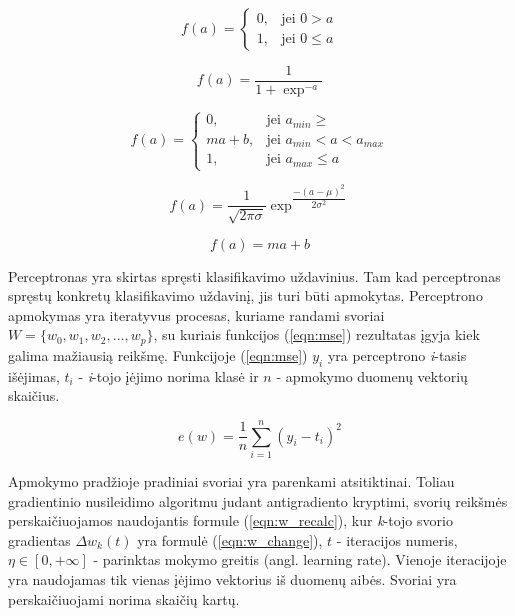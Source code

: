 \begin{equation}
	\label{eqn:unitStep}
	f(a) =
	\begin{cases}
		0, & \mbox{jei } 0 > a \\
		1, & \mbox{jei } 0 \leq a
	\end{cases}
\end{equation}

\begin{equation}
	\label{eqn:sigmoid}
	f(a) = \dfrac{1}{1 + \exp^{-a }}
\end{equation}

\begin{equation}
	\label{eqn:pieceLinear}
	f(a) =
	\begin{cases}
		0, & \mbox{jei } a_{min} \geq  \\
		ma + b, & \mbox{jei } a_{min} < a < a_{max} \\
		1, & \mbox{jei } a_{max} \leq a
	\end{cases}
\end{equation}

\begin{equation}
	\label{eqn:gaussian}
	f(a) = \dfrac{1}{\sqrt{2\pi\sigma}} \exp^{\dfrac{-(a - \mu)^2}{2\sigma^2}}
\end{equation}

\begin{equation}
	\label{eqn:linear}
	f(a) = ma + b
\end{equation}

Perceptronas yra skirtas spręsti klasifikavimo uždavinius. Tam kad perceptronas spręstų konkretų klasifikavimo uždavinį, jis turi būti apmokytas. Perceptrono apmokymas yra iteratyvus procesas, kuriame randami svoriai $W = \{w_{0}, w_{1}, w_{2}, ..., w_{p}\}$, su kuriais funkcijos (\ref{eqn:mse}) rezultatas įgyja kiek galima mažiausią reikšmę. Funkcijoje (\ref{eqn:mse}) $y_i$ yra perceptrono \textit{i}-tasis išėjimas, $t_i$ - \textit{i}-tojo įėjimo norima klasė ir $n$ - apmokymo duomenų vektorių skaičius.

\begin{equation}
	\label{eqn:mse}
	e(w) = \dfrac{1}{n}\sum_{i=1}^{n}(y_i - t_i)^2
\end{equation}

Apmokymo pradžioje pradiniai svoriai yra parenkami atsitiktinai. Toliau gradientinio nusileidimo algoritmu judant antigradiento kryptimi, svorių reikšmės perskaičiuojamos naudojantis formule (\ref{eqn:w_recalc}), kur \textit{k}-tojo svorio gradientas $\Delta w_k(t)$ yra formulė (\ref{eqn:w_change}), $t$ - iteracijos numeris, $\eta \in [0, +\infty]$ - parinktas mokymo greitis (angl. learning rate). Vienoje iteracijoje yra naudojamas tik vienas įėjimo vektorius iš duomenų aibės. Svoriai yra perskaičiuojami norima skaičių kartų.

